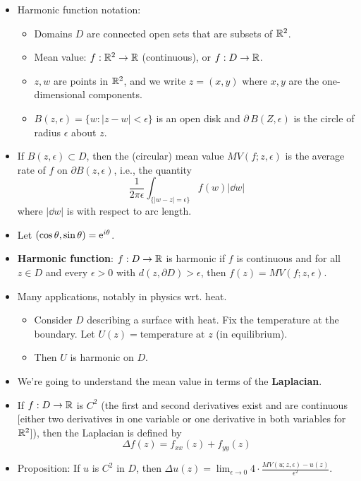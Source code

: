 \documentclass[../main.tex]{subfiles}
\begin{document}
\begin{itemize}
    \item Harmonic function notation:
    \begin{itemize}
        \item Domains $D$ are connected open sets that are subsets of $\R^2$.
        \item Mean value: $f:\R^2\to\R$ (continuous), or $f:D\to\R$.
        \item $z,w$ are points in $\R^2$, and we write $z=(x,y)$ where $x,y$ are the one-dimensional components.
        \item $B(z,\epsilon)=\{w:|z-w|<\epsilon\}$ is an open disk and $\partial\, B(Z,\epsilon)$ is the circle of radius $\epsilon$ about $z$.
    \end{itemize}
    \item If $B(z,\epsilon)\subset D$, then the (circular) mean value $MV(f;z,\epsilon)$ is the average rate of $f$ on $\partial B(z,\epsilon)$, i.e., the quantity
    \begin{equation*}
        \frac{1}{2\pi\epsilon}\int_{\{|w-z|=\epsilon\}}f(w)|\dd{w}|
    \end{equation*}
    where $|\dd{w}|$ is with respect to arc length.
    \item Let $(\cos\theta,\sin\theta)=\e[i\theta]$.
    \item \textbf{Harmonic function}: $f:D\to\R$ is harmonic if $f$ is continuous and for all $z\in D$ and every $\epsilon>0$ with $d(z,\partial D)>\epsilon$, then $f(z)=MV(f;z,\epsilon)$.
    \item Many applications, notably in physics wrt. heat.
    \begin{itemize}
        \item Consider $D$ describing a surface with heat. Fix the temperature at the boundary. Let $U(z)=\text{temperature at }z$ (in equilibrium).
        \item Then $U$ is harmonic on $D$.
    \end{itemize}
    \item We're going to understand the mean value in terms of the \textbf{Laplacian}.
    \item If $f:D\to\R$ is $C^2$ (the first and second derivatives exist and are continuous [either two derivatives in one variable or one derivative in both variables for $\R^2$]), then the Laplacian is defined by
    \begin{equation*}
        \Delta f(z) = f_{xx}(z)+f_{yy}(z)
    \end{equation*}
    \item Proposition: If $u$ is $C^2$ in $D$, then $\Delta u(z)=\lim_{\epsilon\to 0}4\cdot\frac{MV(u;z,\epsilon)-u(z)}{\epsilon^2}$.

\end{itemize}
\end{document}
